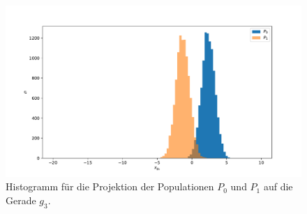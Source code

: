 \documentclass[a4paper, 11pt]{article}
\begin{document}
\begin{figure}
  \centering
  \includegraphics[width=\textwidth]{../A13/A13b_3}
  \caption{Histogramm für die Projektion der Populationen $P_0$ und $P_1$ auf
  die Gerade $g_3$.}
  \label{fig:hist3}
\end{figure}
\FloatBarrier
\end{document}
